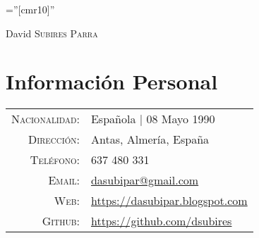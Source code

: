 \documentclass[a4paper,10pt]{article}
\begin{document}
\pagestyle{empty} %

\font\fb=''[cmr10]'' %

\par{\centering
		{\Huge David \textsc{Subires Parra}
	}\bigskip\par}

\section*{Información Personal}

\begin{tabular}{rp{12cm}}
    \textsc{Nacionalidad:} & Española | 08 Mayo 1990 \\
    \textsc{Dirección:}     & Antas, Almería, España \\
    \textsc{Teléfono:}       &  637 480 331 \\
    \textsc{Email:}       & \href {mailto:dasubipar@gmail.com}{dasubipar@gmail.com} \\
    \textsc{Web:}     & \url {https://dasubipar.blogspot.com} \\
    \textsc{Github:}      & \url{https://github.com/dsubires}
\end{tabular}

\end{document}
